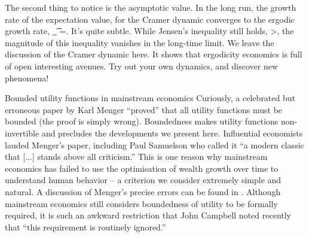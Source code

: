 \begin{itemize}
The second thing to notice is the asymptotic value. In the long run, the growth rate of the 
expectation value, for the Cramer dynamic converges to the ergodic growth rate,
\be
\lim_{\t\to\infty} \frac{\gd\gv(\ave{\x})}{\gd\t}=\ggamma.
\ee
It's quite subtle. While Jensen's inequality still holds,
\be
\frac{\gd\gv(\ave{\x})}{\gd\t}>\frac{\gd\ave{\gv(\x)}}{\gd\t},
\ee
the magnitude of this inequality vanishes in the long-time limit.
We leave the discussion of the Cramer dynamic here. It shows that ergodicity economics is full of 
open interesting avenues. Try out your own dynamics, and discover new phenomena!
%
%
\end{itemize}


\begin{history}{Bounded utility functions in mainstream economics}
Curiously, a celebrated but erroneous paper by Karl Menger \cite{Menger1934} 
``proved'' that all utility functions must be bounded (the proof is simply wrong). Boundedness makes 
utility functions non-invertible and precludes the developments we present here. Influential economists 
lauded Menger's paper, including Paul Samuelson \cite[p.~49]{Samuelson1977} who called it ``a modern 
classic that [...] stands above all criticism.'' This is one reason why mainstream economics
has failed to use the optimisation of wealth growth over time to understand human behavior -- 
a criterion we consider extremely simple and natural. A  discussion of Menger's precise errors 
can be found in \cite[p.~7]{PetersGell-Mann2016}. Although mainstream economics still considers 
boundedness of utility to be formally required, it is such an awkward restriction that John Campbell 
noted recently \cite{Campbell2017} that ``this requirement is routinely ignored.''
\end{history}



